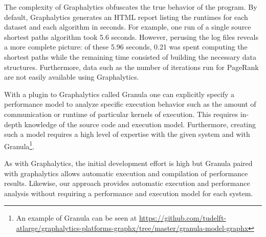 \documentclass{llncs}
\begin{document}
The complexity of Graphalytics obfuscates the true behavior of the program. By default, Graphalytics generates an HTML report listing the runtimes for each dataset and each algorithm in seconds. For example, one run of a single source shortest paths algorithm took 5.6 seconds. However, perusing the log files reveals a more complete picture: of these 5.96 seconds, 0.21 was spent computing the shortest paths while the remaining time consisted of building the necessary data structures. Furthermore, data such as the number of iterations run for PageRank are not easily available using Graphalytics.

With a plugin to Graphalytics called Granula \cite{Ngai:2015:Granula} one can explicitly specify a performance model to analyze specific execution behavior such as the amount of communication or runtime of particular kernels of execution. This requires in-depth knowledge of the source code and execution model. Furthermore, creating such a model requires a high level of expertise with the given system and with Granula\footnote{An example of Granula can be seen at \url{https://github.com/tudelft-atlarge/graphalytics-platforms-graphx/tree/master/granula-model-graphx}}.

As with Graphalytics, the initial development effort is high but Granula paired with graphalytics allows automatic execution and compilation of performance results. Likewise, our approach provides automatic execution and performance analysis without requiring a performance and execution model for each system.
\end{document}
